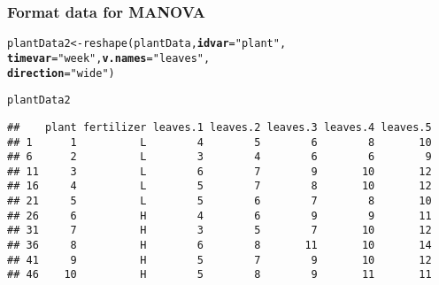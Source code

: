 \documentclass[color=usenames,dvipsnames]{beamer}\usepackage[]{graphicx}\usepackage[]{color}
\makeatletter
\newcommand{\hlstr}[1]{\textcolor[rgb]{0.749,0.012,0.012}{#1}}%
\newcommand{\hlstd}[1]{\textcolor[rgb]{0,0,0}{#1}}%
\newcommand{\hlkwb}[1]{\textcolor[rgb]{0,0.341,0.682}{#1}}%
\newcommand{\hlkwc}[1]{\textcolor[rgb]{0,0,0}{\textbf{#1}}}%
\newcommand{\hlkwd}[1]{\textcolor[rgb]{0.004,0.004,0.506}{#1}}%
\newenvironment{kframe}{%
 \def\at@end@of@kframe{}%
 \ifinner\ifhmode%
  \def\at@end@of@kframe{\end{minipage}}%
  \begin{minipage}{\columnwidth}%
 \fi\fi%
 \def\FrameCommand##1{\hskip\@totalleftmargin \hskip-\fboxsep
 \colorbox{shadecolor}{##1}\hskip-\fboxsep
     \hskip-\linewidth \hskip-\@totalleftmargin \hskip\columnwidth}%
 \MakeFramed {\advance\hsize-\width
   \@totalleftmargin\z@ \linewidth\hsize
   \@setminipage}}%
 {\par\unskip\endMakeFramed%
 \at@end@of@kframe}
\newenvironment{knitrout}{}{} %
\makeatother
\begin{document}
\begin{frame}[fragile]
  \frametitle{Format data for MANOVA}
  \footnotesize
\begin{knitrout}\footnotesize
{}\color{fgcolor}\begin{kframe}
\begin{alltt}
\hlstd{plantData2} \hlkwb{<-} \hlkwd{reshape}\hlstd{(plantData,} \hlkwc{idvar}\hlstd{=}\hlstr{"plant"}\hlstd{,}
                      \hlkwc{timevar}\hlstd{=}\hlstr{"week"}\hlstd{,} \hlkwc{v.names}\hlstd{=}\hlstr{"leaves"}\hlstd{,}
                      \hlkwc{direction}\hlstd{=}\hlstr{"wide"}\hlstd{)}
\end{alltt}
\end{kframe}
\end{knitrout}
\pause
\begin{knitrout}\scriptsize
{}\color{fgcolor}\begin{kframe}
\begin{alltt}
\hlstd{plantData2}
\end{alltt}
\begin{verbatim}
##    plant fertilizer leaves.1 leaves.2 leaves.3 leaves.4 leaves.5
## 1      1          L        4        5        6        8       10
## 6      2          L        3        4        6        6        9
## 11     3          L        6        7        9       10       12
## 16     4          L        5        7        8       10       12
## 21     5          L        5        6        7        8       10
## 26     6          H        4        6        9        9       11
## 31     7          H        3        5        7       10       12
## 36     8          H        6        8       11       10       14
## 41     9          H        5        7        9       10       12
## 46    10          H        5        8        9       11       11
\end{verbatim}
\end{kframe}
\end{knitrout}
\end{frame}
\end{document}
